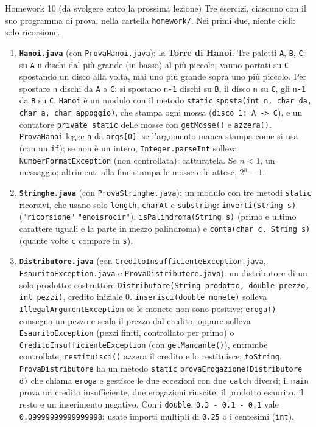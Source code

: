 \documentclass[10pt,aspectratio=169]{beamer}
\begin{document}
\begin{frame}{Homework 10 (da svolgere entro la prossima lezione)}
\footnotesize\setlength{\parskip}{0pt}
Tre esercizi, ciascuno con il suo programma di prova, nella cartella \texttt{homework/}. Nei primi due, niente cicli: solo ricorsione.
\begin{enumerate}\itemsep=3pt
    \item \textbf{\texttt{Hanoi.java}} (con \texttt{ProvaHanoi.java}): la \textbf{Torre di Hanoi}. Tre paletti \texttt{A}, \texttt{B}, \texttt{C}; su \texttt{A} \texttt{n} dischi dal più grande (in basso) al più piccolo; vanno portati su \texttt{C} spostando un disco alla volta, mai uno più grande sopra uno più piccolo. Per spostare \texttt{n} dischi da \texttt{A} a \texttt{C}: si spostano \texttt{n-1} dischi su \texttt{B}, il disco \texttt{n} su \texttt{C}, gli \texttt{n-1} da \texttt{B} su \texttt{C}. \texttt{Hanoi} è un modulo con il metodo \texttt{static} \texttt{sposta(int n, char da, char a, char appoggio)}, che stampa ogni mossa (\texttt{disco 1: A -> C}), e un contatore \texttt{private static} delle mosse con \texttt{getMosse()} e \texttt{azzera()}. \texttt{ProvaHanoi} legge \texttt{n} da \texttt{args[0]}: se l'argomento manca stampa come si usa (con un \texttt{if}); se non è un intero, \texttt{Integer.parseInt} solleva \texttt{NumberFormatException} (non controllata): catturatela. Se $n < 1$, un messaggio; altrimenti alla fine stampa le mosse e le attese, $2^n - 1$.
    \item \textbf{\texttt{Stringhe.java}} (con \texttt{ProvaStringhe.java}): un modulo con tre metodi \texttt{static} ricorsivi, che usano solo \texttt{length}, \texttt{charAt} e \texttt{substring}: \texttt{inverti(String s)} (\texttt{"ricorsione"} \textrightarrow{} \texttt{"enoisrocir"}), \texttt{isPalindroma(String s)} (primo e ultimo carattere uguali e la parte in mezzo palindroma) e \texttt{conta(char c, String s)} (quante volte \texttt{c} compare in \texttt{s}).
    \item \textbf{\texttt{Distributore.java}} (con \texttt{CreditoInsufficienteException.java}, \texttt{EsauritoException.java} e \texttt{ProvaDistributore.java}): un distributore di un solo prodotto: costruttore \texttt{Distributore(String prodotto, double prezzo, int pezzi)}, credito iniziale 0. \texttt{inserisci(double monete)} solleva \texttt{IllegalArgumentException} se le monete non sono positive; \texttt{eroga()} consegna un pezzo e scala il prezzo dal credito, oppure solleva \texttt{EsauritoException} (pezzi finiti, controllato per primo) o \texttt{CreditoInsufficienteException} (con \texttt{getMancante()}), entrambe controllate; \texttt{restituisci()} azzera il credito e lo restituisce; \texttt{toString}. \texttt{ProvaDistributore} ha un metodo \texttt{static} \texttt{provaErogazione(Distributore d)} che chiama \texttt{eroga} e gestisce le due eccezioni con due \texttt{catch} diversi; il \texttt{main} prova un credito insufficiente, due erogazioni riuscite, il prodotto esaurito, il resto e un inserimento negativo. Con i \texttt{double}, \texttt{0.3 - 0.1 - 0.1} vale \texttt{0.09999999999999998}: usate importi multipli di \texttt{0.25} o i centesimi (\texttt{int}).

\end{enumerate}
\end{frame}
\end{document}
